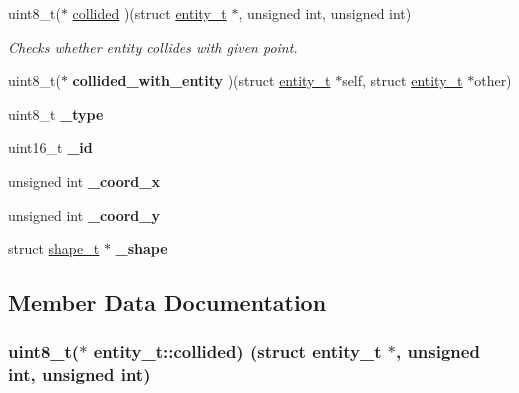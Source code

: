 \begin{DoxyCompactItemize}
\item 
uint8\+\_\+t($\ast$ \hyperlink{structentity__t_ab2bd16baec01377027730357085fae2b}{collided} )(struct \hyperlink{structentity__t}{entity\+\_\+t} $\ast$, unsigned int, unsigned int)
\begin{DoxyCompactList}\small\item\em Checks whether entity collides with given point. \end{DoxyCompactList}\item 
uint8\+\_\+t($\ast$ {\bfseries collided\+\_\+with\+\_\+entity} )(struct \hyperlink{structentity__t}{entity\+\_\+t} $\ast$self, struct \hyperlink{structentity__t}{entity\+\_\+t} $\ast$other)\hypertarget{structentity__t_ab1f94771f20f72996bbf52c1eafc544d}{}\label{structentity__t_ab1f94771f20f72996bbf52c1eafc544d}

\item 
uint8\+\_\+t {\bfseries \+\_\+type}\hypertarget{structentity__t_a84264a65994ee1a41993c993b341ccb0}{}\label{structentity__t_a84264a65994ee1a41993c993b341ccb0}

\item 
uint16\+\_\+t {\bfseries \+\_\+id}\hypertarget{structentity__t_a26a446b75f81a350b755c5dfdfde8db0}{}\label{structentity__t_a26a446b75f81a350b755c5dfdfde8db0}

\item 
unsigned int {\bfseries \+\_\+coord\+\_\+x}\hypertarget{structentity__t_ad36a8fa7c873a0e31cc9fe3125d8151e}{}\label{structentity__t_ad36a8fa7c873a0e31cc9fe3125d8151e}

\item 
unsigned int {\bfseries \+\_\+coord\+\_\+y}\hypertarget{structentity__t_a361a23e26faf7f39183c6fc9c92c8b24}{}\label{structentity__t_a361a23e26faf7f39183c6fc9c92c8b24}

\item 
struct \hyperlink{structshape__t}{shape\+\_\+t} $\ast$ {\bfseries \+\_\+shape}\hypertarget{structentity__t_ab88ab070ce902399fe017bbe390881e5}{}\label{structentity__t_ab88ab070ce902399fe017bbe390881e5}

\end{DoxyCompactItemize}


\subsection{Member Data Documentation}
\subsubsection[{\texorpdfstring{collided}{collided}}]{\setlength{\rightskip}{0pt plus 5cm}uint8\+\_\+t($\ast$ entity\+\_\+t\+::collided) (struct {\bf entity\+\_\+t} $\ast$, unsigned int, unsigned int)}\hypertarget{structentity__t_ab2bd16baec01377027730357085fae2b}{}\label{structentity__t_ab2bd16baec01377027730357085fae2b}


